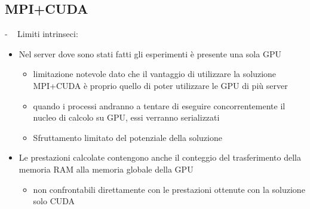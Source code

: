 \documentclass[compress]{beamer}
\begin{document}
\subsection{MPI+CUDA}
\begin{frame}{\secname \text{ }- \subsecname\ }
    Limiti intrinseci:
    \begin{itemize}
        \item Nel server dove sono stati fatti gli esperimenti è presente una sola GPU
        \begin{itemize}
            \item limitazione notevole dato che il vantaggio di utilizzare la soluzione MPI+CUDA è proprio quello di poter utilizzare le GPU di più server
            \item quando i processi andranno a tentare di eseguire concorrentemente il nucleo di calcolo su GPU, essi verranno serializzati
            \item Sfruttamento limitato del potenziale della soluzione
        \end{itemize}
        \item Le prestazioni calcolate contengono anche il conteggio del trasferimento della memoria RAM alla memoria globale della GPU
        \begin{itemize}
            \item non confrontabili direttamente con le prestazioni ottenute con la soluzione solo CUDA
        \end{itemize}
    \end{itemize}
\end{frame}
\end{document}
